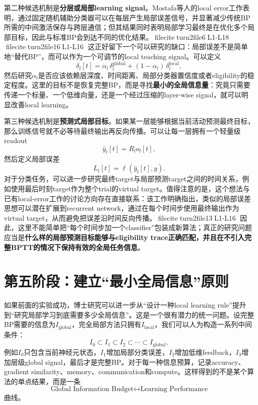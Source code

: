 \documentclass[journal,12pt,onecolumn]{IEEEtran}
\begin{document}
第二种候选机制是\textbf{分层或局部learning signal}。Mostafa等人的local error工作表明，通过固定随机辅助分类器可以在每层产生局部误差信号，并显著减少传统BP所需的中间激活保存与跨层通信；但其结果同时表明局部学习最终是在优化多个局部目标，因此与标准BP会到达不同的优化结果。fileciteturn2file6L1-L18 fileciteturn2file16L1-L16 这正好留下一个可以研究的缺口：局部误差不是简单地“替代BP”，而可以作为一个可调节的local teaching signal。可以定义
\begin{equation}
\delta_l[t]
=
\alpha_l\,\delta_l^{\mathrm{global}}
+
(1-\alpha_l)\,\delta_l^{\mathrm{local}},
\end{equation}
然后研究$\alpha_l$是否应该依赖层深度、时间距离、局部分类器置信度或者eligibility的稳定程度。这里的目标不是恢复完整BP，而是寻找\textbf{最小的全局信息量}：究竟只需要传递一个标量、一个低维向量，还是一个经过压缩的layer-wise signal，就可以明显改善local learning。

第三种候选机制是\textbf{预测式局部目标}。如果某一层能够根据当前活动预测最终目标，那么训练信号就不必等待最终输出再反向传播。可以让每一层拥有一个轻量级readout
\begin{equation}
\hat y_l[t]=R_l o_l[t],
\end{equation}
然后定义局部误差
\begin{equation}
L_l[t]=\ell(\hat y_l[t],y).
\end{equation}
对于分类任务，可以进一步研究最终target与局部预测target之间的时间关系，例如使用最后时刻target作为整个trial的virtual target。值得注意的是，这个想法与已有local-error工作的讨论方向存在直接联系：该工作明确指出，类似的局部误差思想可以潜在扩展到recurrent network，通过在每个时间步使用最终输出作为virtual target，从而避免把误差沿时间反向传播。fileciteturn2file13L1-L16 因此，这里不能简单把“每个时间步加一个classifier”包装成新算法；真正的研究问题应当是\textbf{什么样的局部预测目标能够与eligibility trace正确匹配，并且在不引入完整BPTT的情况下保持有效的全局任务信息}。

\section{第五阶段：建立“最小全局信息”原则}

如果前面的实验成功，博士研究可以进一步从“设计一种local learning rule”提升到“研究局部学习到底需要多少全局信息”。这是一个很有潜力的统一问题。设完整BP需要的信息为$I_{\mathrm{global}}$，完全局部方法只拥有$I_{\mathrm{local}}$，我们可以人为构造一系列中间条件：
\begin{equation}
I_0\subset I_1\subset I_2\subset\cdots\subset I_{\mathrm{global}},
\end{equation}
例如$ I_0$只包含当前神经元状态，$I_1$增加局部分类误差，$I_2$增加低维feedback，$I_3$增加层级global signal，最后才是完整BP。对于每一种信息预算，记录accuracy、gradient similarity、memory、communication和compute。这样得到的不是某个算法的单点结果，而是一条
\begin{equation}
\text{Global Information Budget}
\leftrightarrow
\text{Learning Performance}
\end{equation}
曲线。
\end{document}
